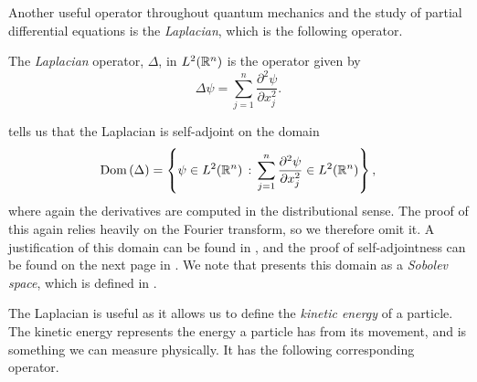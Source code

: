 Another useful operator throughout quantum mechanics and the study of partial differential equations is the {\emph{Laplacian}}, which is the following operator.

\begin{definition}
  The {\emph{Laplacian}} operator, $\Delta$, in $L^2(\mathbb{R}^n)$ is the operator given by
  \begin{equation*}
    \Delta \psi = \sum_{j = 1}^{n} \frac{\partial^2 \psi}{\partial x_j^2}.
  \end{equation*}
\end{definition}
\begin{remark}\label{lbl_laplacian_SA_domain}
  {\cite[Proposition 9.34]{Hall2013}} tells us that the Laplacian is self-adjoint on the domain
  \begin{equation*}
    \operatorname{Dom}\left(\Delta\right) = \left\{\psi \in L^2(\mathbb{R}^n) \, : \, \sum_{j = 1}^{n} \frac{\partial^2 \psi}{\partial x_j^2} \in L^2(\mathbb{R}^n) \right\},
  \end{equation*}
  where  again the derivatives are computed in the distributional sense. The proof of this again relies heavily on the Fourier transform, so we therefore omit it. A justification of this domain can be found in {\cite[p.167]{teschl}}, and the proof of self-adjointness can be found on the next page in {\cite[Theorem 7.8]{teschl}}. We note that {\cite{teschl}} presents this domain as a {\emph{Sobolev space}}, which is defined in {\cite[p.164]{teschl}}.
\end{remark}
The Laplacian is useful as it allows us to define the {\emph{kinetic energy}} of a particle. The kinetic energy represents the energy a particle has from its movement, and is something we can measure physically. It has the following corresponding operator.

